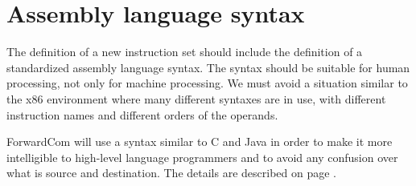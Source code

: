 \documentclass[forwardcom.tex]{subfiles}
\begin{document}
\section{Assembly language syntax} \label{assemblySyntax}
The definition of a new instruction set should include the definition of a standardized assembly language syntax. The syntax should be suitable for human processing, not only for machine processing. We must avoid a situation similar to the x86 environment where many different syntaxes are in use, with different instruction names and different orders of the operands. 
\vspace{2mm}

ForwardCom will use a syntax similar to C and Java in order to make it more intelligible to high-level language programmers and to avoid any confusion over what is source and destination. 
The details are described on page \pageref{assemblerCommandLine}.
\end{document}
